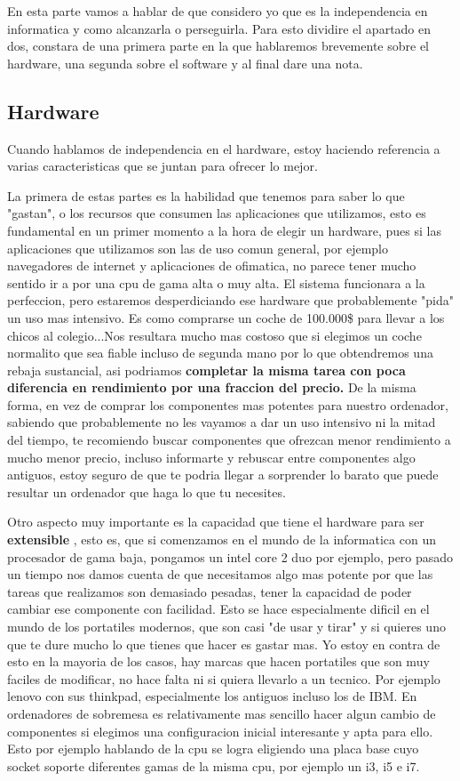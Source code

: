 En esta parte vamos a hablar de que considero yo que es la independencia en informatica y como alcanzarla o perseguirla. Para esto dividire el apartado en dos, constara de una primera parte en la que hablaremos brevemente sobre el hardware, una segunda sobre el software y al final dare una nota.

\subsection{ Hardware }

Cuando hablamos de independencia en el hardware, estoy haciendo referencia a varias caracteristicas que se juntan para ofrecer lo mejor. 

La primera de estas partes es la habilidad que tenemos para saber lo que "gastan", o los recursos que consumen las aplicaciones que utilizamos, esto es fundamental en un primer momento a la hora de elegir un hardware, pues si las aplicaciones que utilizamos son las de uso comun general, por ejemplo navegadores de internet y aplicaciones de ofimatica, no parece tener mucho sentido ir a por una cpu de gama alta o muy alta. El sistema funcionara a la perfeccion, pero estaremos desperdiciando ese hardware que probablemente "pida" un uso mas intensivo. Es como comprarse un coche de 100.000\$ para llevar a los chicos al colegio...Nos resultara mucho mas costoso que si elegimos un coche normalito que sea fiable incluso de segunda mano por lo que obtendremos una rebaja sustancial, asi podriamos \textbf{ completar la misma tarea con poca diferencia en rendimiento por una fraccion del precio. } De la misma forma, en vez de comprar los componentes mas potentes para nuestro ordenador, sabiendo que probablemente no les vayamos a dar un uso intensivo ni la mitad del tiempo, te recomiendo buscar componentes que ofrezcan menor rendimiento a mucho menor precio, incluso informarte y rebuscar entre componentes algo antiguos, estoy seguro de que te podria llegar a sorprender lo barato que puede resultar un ordenador que haga lo que tu necesites.

Otro aspecto muy importante es la capacidad que tiene el hardware para ser \textbf{ extensible }, esto es, que si comenzamos en el mundo de la informatica con un procesador de gama baja, pongamos un intel core 2 duo por ejemplo, pero pasado un tiempo nos damos cuenta de que necesitamos algo mas potente por que las tareas que realizamos son demasiado pesadas, tener la capacidad de poder cambiar ese componente con facilidad. Esto se hace especialmente dificil en el mundo de los portatiles modernos, que son casi "de usar y tirar" y si quieres uno que te dure mucho lo que tienes que hacer es gastar mas. Yo estoy en contra de esto en la mayoria de los casos, hay marcas que hacen portatiles que son muy faciles de modificar, no hace falta ni si quiera llevarlo a un tecnico. Por ejemplo lenovo con sus thinkpad, especialmente los antiguos incluso los de IBM. En ordenadores de sobremesa es relativamente mas sencillo hacer algun cambio de componentes si elegimos una configuracion inicial interesante y apta para ello. Esto por ejemplo hablando de la cpu se logra eligiendo una placa base cuyo socket soporte diferentes gamas de la misma cpu, por ejemplo un i3, i5 e i7. 

